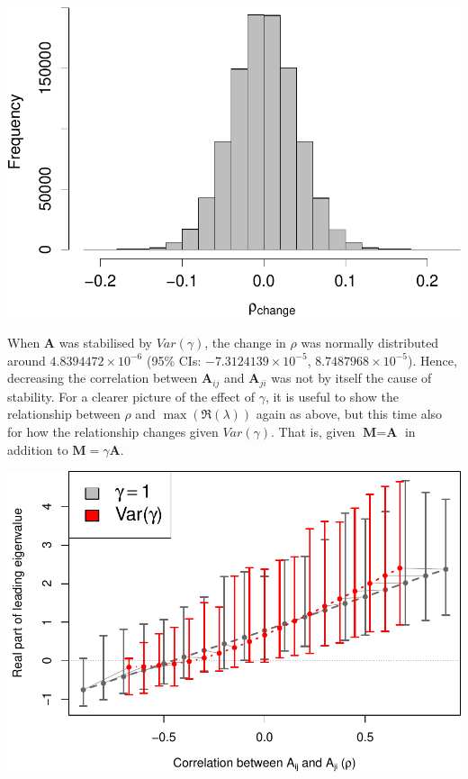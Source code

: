 \documentclass[]{article}
\begin{document}
\includegraphics{revision_notes_files/figure-latex/unnamed-chunk-7-1.pdf}

When \(\textbf{A}\) was stabilised by \(Var(\gamma)\), the change in
\(\rho\) was normally distributed around
\ensuremath{4.8394472\times 10^{-6}} (95\% CIs:
\ensuremath{-7.3124139\times 10^{-5}},
\ensuremath{8.7487968\times 10^{-5}}). Hence, decreasing the correlation
between \(\textbf{A}_{ij}\) and \(\textbf{A}_{ji}\) was not by itself
the cause of stability. For a clearer picture of the effect of
\(\gamma\), it is useful to show the relationship between \(\rho\) and
\(\max(\Re(\lambda))\) again as above, but this time also for how the
relationship changes given \(Var(\gamma)\). That is, given
\(\textbf{M} = \textbf{A}\) in addition to
\(\textbf{M} = \gamma\textbf{A}\).

\includegraphics{revision_notes_files/figure-latex/unnamed-chunk-8-1.pdf}
\end{document}
